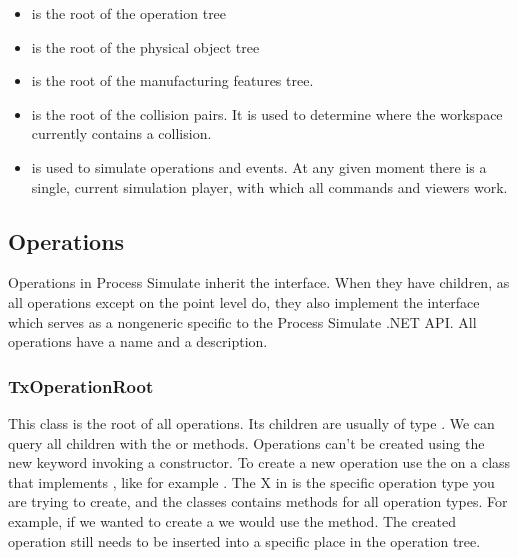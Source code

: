 \begin{itemize}

\item {} is the root of the operation tree

\item {} is the root of the physical object tree

\item {} is the root of the manufacturing features tree.

\item {} is the root of the collision pairs.
It is used to determine where the workspace currently contains a collision.

\item {} is used to simulate operations and events.
At any given moment there is a single, current simulation player, with which all commands and viewers work.
\end{itemize}

\subsection{Operations}

Operations in Process Simulate inherit the  interface. When they have children, as all operations except on the point level do, they also implement the  interface which serves as a nongeneric  specific to the Process Simulate .NET API. All operations have a name and a description.

\subsubsection{TxOperationRoot}

This class is the root of all operations.
Its children are usually of type .
We can query all children with the  or  methods.
Operations can't be created using the new keyword invoking a constructor.
To create a new operation use the  on a class that implements , like for example . The X in  is the specific operation type you are trying to create, and the classes contains methods for all operation types. For example, if we wanted to create a  we would use the   method.
The created operation still needs to be inserted into a specific place in the operation tree.

